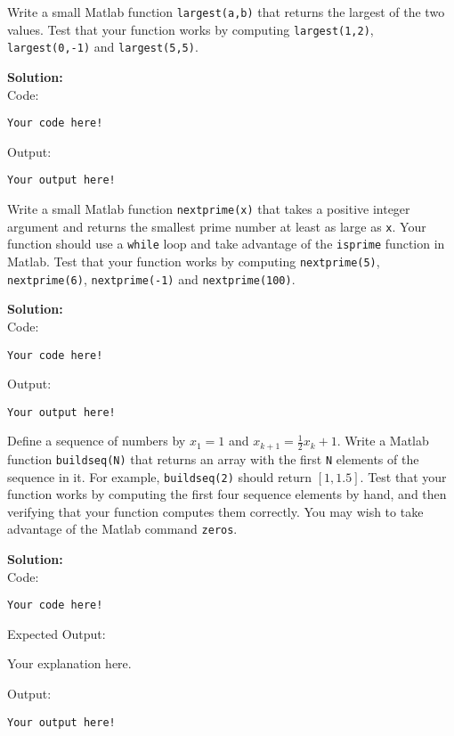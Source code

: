 \documentclass[12pt]{article}
\makeatletter
\theoremstyle{homework}
\newenvironment{exercise}[1]
{\def\@currentlabel{#1}\exercisecore}
{\endexercisecore}
\newcommand{\localhead}[1]{\par\smallskip\noindent\textbf{#1}\nobreak\\}%
\newcommand\solution{\localhead{Solution:}}
\makeatother
\begin{document}
\begin{exercise}{DM 1}
Write a small Matlab function \texttt{largest(a,b)} that
returns the largest of the two values.  Test that your function
works by computing \texttt{largest(1,2)}, \texttt{largest(0,-1)}
and \texttt{largest(5,5)}.
\end{exercise}
\solution
Code:
\begin{verbatim}
Your code here!
\end{verbatim}

Output:
\begin{verbatim}
Your output here!
\end{verbatim}

\begin{exercise}{DM 2} Write a small Matlab function \texttt{nextprime(x)} 
that takes a positive integer argument and returns the smallest 
prime number at least as large as \texttt{x}.  Your function should
use a \texttt{while} loop and take advantage of the \texttt{isprime}
function in Matlab.  Test that your function works by computing 
\texttt{nextprime(5)}, \texttt{nextprime(6)}, \texttt{nextprime(-1)}
and \texttt{nextprime(100)}.
\end{exercise}
\solution
Code:
\begin{verbatim}
Your code here!
\end{verbatim}

Output:
\begin{verbatim}
Your output here!
\end{verbatim}

\begin{exercise}{DM 3} Define a sequence of numbers by $x_1=1$ and $x_{k+1}=\frac{1}{2}x_{k} + 1$.  Write a Matlab function \texttt{buildseq(N)} that returns an array
with the first \texttt{N} elements of the sequence in it.  For example,
\texttt{buildseq(2)} should return $[1,1.5]$.  Test that your function
works by computing the first four sequence elements by hand, and then
verifying that your function computes them correctly.  You may wish 
to take advantage of the Matlab command \texttt{zeros}.
\end{exercise}
\solution
Code:
\begin{verbatim}
Your code here!
\end{verbatim}

Expected Output:

Your explanation here.

Output:
\begin{verbatim}
Your output here!
\end{verbatim}
\end{document}

